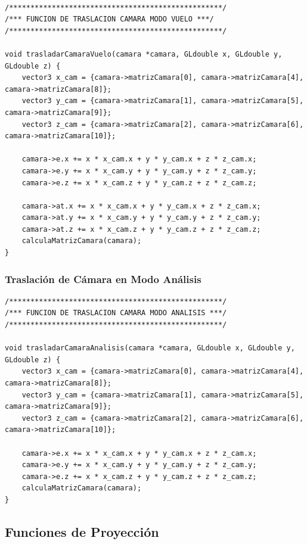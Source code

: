 \documentclass[12pt,a4paper]{article}
\begin{document}
\begin{lstlisting}

/**************************************************/
/*** FUNCION DE TRASLACION CAMARA MODO VUELO ***/
/**************************************************/

void trasladarCamaraVuelo(camara *camara, GLdouble x, GLdouble y, GLdouble z) {
    vector3 x_cam = {camara->matrizCamara[0], camara->matrizCamara[4], camara->matrizCamara[8]};
    vector3 y_cam = {camara->matrizCamara[1], camara->matrizCamara[5], camara->matrizCamara[9]};
    vector3 z_cam = {camara->matrizCamara[2], camara->matrizCamara[6], camara->matrizCamara[10]};

    camara->e.x += x * x_cam.x + y * y_cam.x + z * z_cam.x;
    camara->e.y += x * x_cam.y + y * y_cam.y + z * z_cam.y;
    camara->e.z += x * x_cam.z + y * y_cam.z + z * z_cam.z;

    camara->at.x += x * x_cam.x + y * y_cam.x + z * z_cam.x;
    camara->at.y += x * x_cam.y + y * y_cam.y + z * z_cam.y;
    camara->at.z += x * x_cam.z + y * y_cam.z + z * z_cam.z;
    calculaMatrizCamara(camara);
}
\end{lstlisting}

\newpage
\subsubsection{Traslación de Cámara en Modo Análisis}

\begin{lstlisting}
/**************************************************/
/*** FUNCION DE TRASLACION CAMARA MODO ANALISIS ***/
/**************************************************/

void trasladarCamaraAnalisis(camara *camara, GLdouble x, GLdouble y, GLdouble z) {
    vector3 x_cam = {camara->matrizCamara[0], camara->matrizCamara[4], camara->matrizCamara[8]};
    vector3 y_cam = {camara->matrizCamara[1], camara->matrizCamara[5], camara->matrizCamara[9]};
    vector3 z_cam = {camara->matrizCamara[2], camara->matrizCamara[6], camara->matrizCamara[10]};

    camara->e.x += x * x_cam.x + y * y_cam.x + z * z_cam.x;
    camara->e.y += x * x_cam.y + y * y_cam.y + z * z_cam.y;
    camara->e.z += x * x_cam.z + y * y_cam.z + z * z_cam.z;
    calculaMatrizCamara(camara);
}
\end{lstlisting}


\subsection{Funciones de Proyección}
\end{document}

